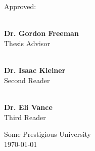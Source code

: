 \begin{center}
\vspace{2cm}
\\
\vspace{0.7cm}
\vspace{0.7cm}
\\
\end{center}
\vfill
{\Large Approved:}
\begin{flushright}
\makebox[0.5\textwidth ]{\hrulefill}\\
\textbf{Dr. Gordon Freeman}\\ Thesis Advisor
\vspace{1.25cm}

\makebox[0.5\textwidth ]{\hrulefill}\\
\textbf{Dr. Isaac Kleiner}\\ Second Reader
\vspace{1.25cm}

\makebox[0.5\textwidth ]{\hrulefill}\\
\textbf{Dr. Eli Vance}\\Third Reader
\vfill

\begin{center}
\large {Some Prestigious University\\\today}
\end{center}
\end{flushright}
